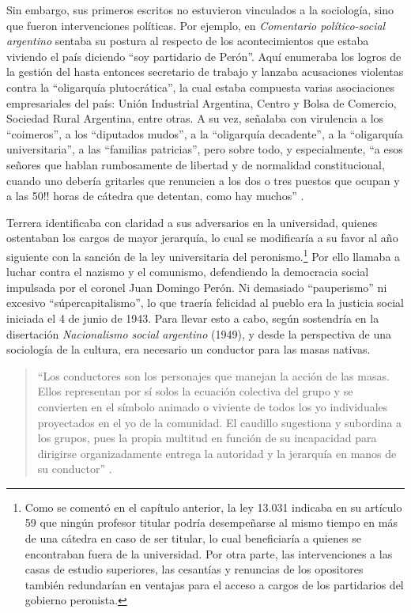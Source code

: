Sin embargo, sus primeros escritos no estuvieron vinculados a la sociología, sino que fueron intervenciones políticas. Por ejemplo, en \emph{Comentario político-social argentino} \textcite[13]{1712-TERRERA1946} sentaba su postura al respecto de los acontecimientos que estaba viviendo el país diciendo \enquote{soy partidario de Perón}. Aquí enumeraba los logros de la gestión del hasta entonces secretario de trabajo y lanzaba acusaciones violentas contra la \enquote{oligarquía plutocrática}, la cual estaba compuesta varias asociaciones empresariales del país: Unión Industrial Argentina, Centro y Bolsa de Comercio, Sociedad Rural Argentina, entre otras. A su vez, señalaba con virulencia a los \enquote{coimeros}, a los \enquote{diputados mudos}, a la \enquote{oligarquía decadente}, a la \enquote{oligarquía universitaria}, a las \enquote{familias patricias}, pero sobre todo, y especialmente, \enquote{a esos señores que hablan rumbosamente de libertad y de normalidad constitucional, cuando uno debería gritarles que renuncien a los dos o tres puestos que ocupan y a las 50!! horas de cátedra que detentan, como hay muchos} \parencite[40]{1712-TERRERA1946}.

Terrera identificaba con claridad a sus adversarios en la universidad, quienes ostentaban los cargos de mayor jerarquía, lo cual se modificaría a su favor al año siguiente con la sanción de la ley universitaria del peronismo.\footnote{Como se comentó en el capítulo anterior, la ley 13.031 indicaba en su artículo 59 que ningún profesor titular podría desempeñarse al mismo tiempo en más de una cátedra en caso de ser titular, lo cual beneficiaría a quienes se encontraban fuera de la universidad. Por otra parte, las intervenciones a las casas de estudio superiores, las cesantías y renuncias de los opositores también redundarían en ventajas para el acceso a cargos de los partidarios del gobierno peronista.} Por ello llamaba a luchar contra el nazismo y el comunismo, defendiendo la democracia social impulsada por el coronel Juan Domingo Perón. Ni demasiado \enquote{pauperismo} ni excesivo \enquote{súpercapitalismo}, lo que traería felicidad al pueblo era la justicia social iniciada el 4 de junio de 1943. Para llevar esto a cabo, según sostendría en la disertación \emph{Nacionalismo social argentino} (1949), y desde la perspectiva de una sociología de la cultura, era necesario un conductor para las masas nativas.

\begin{quote}
\enquote{Los conductores son los personajes que manejan la acción de las masas. Ellos representan por sí solos la ecuación colectiva del grupo y se convierten en el símbolo animado o viviente de todos los yo individuales proyectados en el yo de la comunidad. El caudillo sugestiona y subordina a los grupos, pues la propia multitud en función de su incapacidad para dirigirse organizadamente entrega la autoridad y la jerarquía en manos de su conductor} \parencite[27]{1713-TERRERA1949}.
\end{quote}

